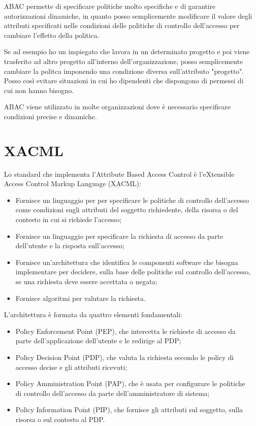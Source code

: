 ABAC permette di specificare politiche molto specifiche e di garantire autorizzazioni dinamiche, in quanto posso semplicemente modificare il valore degli attributi specificati nelle condizioni delle politiche di controllo dell'accesso per cambiare l'effetto della politica.

Se ad esempio ho un impiegato che lavora in un  determinato progetto e poi viene trasferito ad altro progetto all'interno dell'organizzazione, posso semplicemente cambiare la politca imponendo una condizione diversa sull'attributo "progetto". Posso così evitare situazioni in cui ho dipendenti che dispongono di permessi di cui non hanno bisogno. 

ABAC viene utilizzato in molte organizzazioni dove è necessario specificare condizioni precise e dinamiche.

\section{XACML}
Lo standard che implementa l'Attribute Based Access Control è l'eXtensible Access Control Markup Language (XACML):
\begin{itemize}
    \item Fornisce un linguaggio per per specificare le politiche di controllo dell'accesso come condizioni sugli attributi del soggetto richiedente, della risorsa o del contesto in cui si richiede l'accesso;
    \item Fornisce un linguaggio per specificare la richiesta di accesso da parte dell'utente e la risposta sull'accesso;
    \item Fornisce un'architettura che identifica le componenti software che bisogna implementare per decidere, sulla base delle politiche sul controllo dell'accesso, se una richiesta deve essere accettata o negata;
    \item Fornisce algoritmi per valutare la richiesta.
\end{itemize}

\noindent L'architettura è formata da quattro elementi fondamentali:
\begin{itemize}
    \item Policy Enforcement Point (PEP), che intercetta le richieste di accesso da parte dell'applicazione dell'utente e le redirige al PDP;
    \item Policy Decision Point (PDP), che valuta la richiesta secondo le policy di accesso decise e gli attributi ricevuti;
    \item Policy Amministration Point (PAP), che è usata per configurare le politiche di controllo dell'accesso da parte dell'amministratore di sistema;
    \item Policy Information Point (PIP), che fornisce gli attributi sul soggetto, sulla risorsa o sul contesto al PDP.
\end{itemize}

